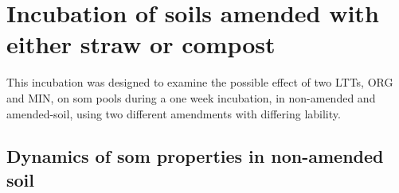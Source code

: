 







\section{Incubation of soils amended with either straw or compost}
    This incubation was designed to examine the possible effect of two LTTs, ORG and MIN, on \gls{som} pools during a one week incubation, in non-amended and amended-soil, using two different amendments with differing lability.

    \subsection{Dynamics of \gls{som} properties in non-amended soil}

